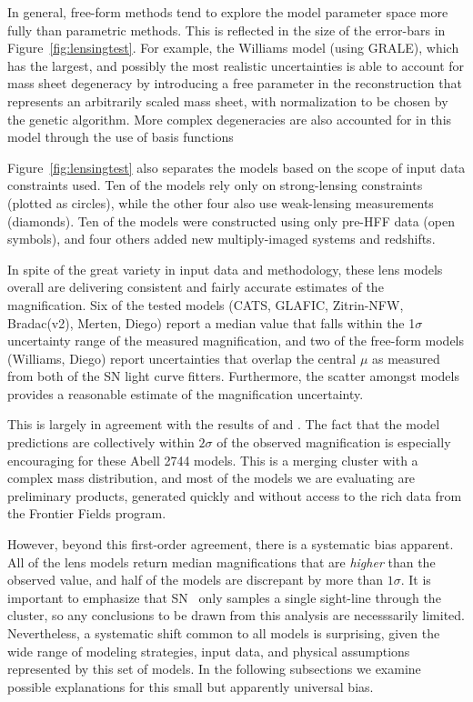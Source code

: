 In general, free-form methods tend to explore the model parameter
space more fully than parametric methods.  This is reflected in the
size of the error-bars in Figure~\ref{fig:lensingtest}.  For example,
the Williams model (using GRALE), which has the largest, and possibly the
most realistic uncertainties is able to account for mass sheet
degeneracy by introducing a free parameter in the reconstruction that
represents an arbitrarily scaled mass sheet, with normalization to
be chosen by the genetic algorithm.  More complex degeneracies are
also accounted for in this model through the use of basis
functions \citep{Liesenborgs:2006,Liesenborgs:2007,Mohammed:2014}

Figure~\ref{fig:lensingtest} also separates the models based on the
scope of input data constraints used.  Ten of the models rely only
on strong-lensing constraints (plotted as circles), while the other
four also use weak-lensing measurements (diamonds).  Ten of the
models were constructed using only pre-HFF data (open symbols), and
four others added new multiply-imaged systems and redshifts.

In spite of the great variety in input data and methodology, these
lens models overall are delivering consistent and fairly accurate
estimates of the magnification.  Six of the tested models
(CATS, GLAFIC, Zitrin-NFW, Bradac(v2), Merten, Diego) report a median
value that falls within the 1$\sigma$ uncertainty range of the
measured magnification, and two of the free-form models (Williams,
Diego) report uncertainties that overlap the central $\mu$ as measured
from both of the SN light curve fitters.  Furthermore, the scatter
amongst models provides a reasonable estimate of the magnification
uncertainty.

This is largely in agreement with the results
of  and \citet{Nordin:2014}.  The fact that the
model predictions are collectively within $2\sigma$ of the observed
magnification is especially encouraging for these Abell 2744
models. This is a merging cluster with a complex mass distribution,
and most of the models we are evaluating are preliminary products,
generated quickly and without access to the rich data from the
Frontier Fields program.

However, beyond this first-order agreement, there is a systematic bias
apparent. All of the lens models return median magnifications
that are {\it higher} than the observed value, and half of
the models are discrepant by more than $1\sigma$.  It is important to
emphasize that SN \tomas\ only samples a single sight-line through the
cluster, so any conclusions to be drawn from this analysis are
necesssarily limited.  Nevertheless, a systematic shift common to all
models is surprising, given the wide range of modeling strategies,
input data, and physical assumptions represented by this set of
models.  In the following subsections we examine possible explanations
for this small but apparently universal bias.

